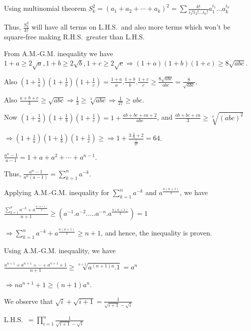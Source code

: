   Using multinomial theorem $S_k^2 = (a_1 + a_2 + \cdots + a_k)^2 = \sum \frac{k!}{i_1!i_2!\ldots
    i_n!}a_1^{i_1}\ldots a_k^{i_n}$

  Thus, $\frac{S_k^2}{k!}$ will have all terms on L.H.S.\ and also more terms which won't be square-free
  making R.H.S.\ greater than L.H.S.
\item From A.M.-G.M. inequality we have $1 + a\geq 2\sqrt{a}, 1 + b\geq 2\sqrt{b}, 1 + c\geq
  2\sqrt{c}\Rightarrow (1 + a)(1 + b)(1 + c)\geq 8\sqrt{abc}$.

  Also $\left(1 + \frac{1}{a}\right)\left(1 + \frac{1}{b}\right)\left(1 + \frac{1}{c}\right) = \frac{1 +
    a}{a}.\frac{1 + b}{b}.\frac{1 + c}{c}\geq \frac{8\sqrt{abc}}{abc} = \frac{8}{\sqrt{abc}}$.

  Also $\frac{a + b + c}{3}\geq \sqrt{abc}\Rightarrow \frac{1}{3}\geq \sqrt[3]{abc}\Rightarrow
  \frac{1}{27}\geq abc$.

  Now $\left(1 + \frac{1}{a}\right)\left(1 + \frac{1}{b}\right)\left(1 + \frac{1}{c}\right) = 1 + \frac{ab +
    bc + ca + 2}{abc}$, and $\frac{ab + bc + ca}{3}\geq \sqrt[3]{(abc)^2}$

  $\Rightarrow \left(1 + \frac{1}{a}\right)\left(1 + \frac{1}{b}\right)\left(1 + \frac{1}{c}\right) \geq
  \Rightarrow 1 + \frac{3.\frac{1}{9} + 2}{\frac{1}{27}} = 64$.
\item $\frac{a^n - 1}{a - 1} = 1 + a + a^2 + \cdots + a^{n - 1}$.

  Thus, $\frac{a^n - 1}{a^n(a - 1)} = \displaystyle\sum_{k = 1}^na^{-k}$.

  Applying A.M.-G.M. inequality for $\displaystyle\sum_{k = 1}^na^{-k}$ and $a^{\frac{n(n + 1)}{2}}$, we have

  $\frac{\displaystyle\sum_{k = 1}^na^{-k} + a^{\frac{n(n + 1)}{2}}}{n + 1}\geq
  (a^{-1}.a^{-2}.\ldots.a^{-n}.a^{\frac{n(n + 1)}{2}}) = 1$

  $\Rightarrow \displaystyle\sum_{k = 1}^na^{-k} + a^{\frac{n(n + 1)}{2}}\geq n + 1$, and hence, the
  inequality is proven.
\item Using A.M.-G.M. inequality, we have

  $\displaystyle\frac{a^{n + 1} + a^{n + 1} + \cdots + a^{n + 1} + 1}{n + 1}\geq \sqrt[n + 1]{a^{(n +
    1)n}.1} = a^n$

  $\Rightarrow \displaystyle na^{n + 1} + 1\geq (n + 1)a^n$.
\item We observe that $\displaystyle\sqrt{i} + \sqrt{i + 1} = \frac{1}{\sqrt{i + 1} - \sqrt{i}}$

  L.H.S.\ $= \displaystyle\prod_{i = 1}^n\frac{1}{\sqrt{i + 1} - \sqrt{i}}$

